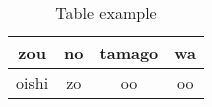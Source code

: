 {
  \begin{table}[th!]
    \centering
    \begin{tabular}{cccc}
      \toprule
      zou & no & tamago & wa \\\midrule
      oishi & zo & oo & oo\\
      \bottomrule
    \end{tabular}
    \caption{Table example}
    \label{table:example}
  \end{table}
}
